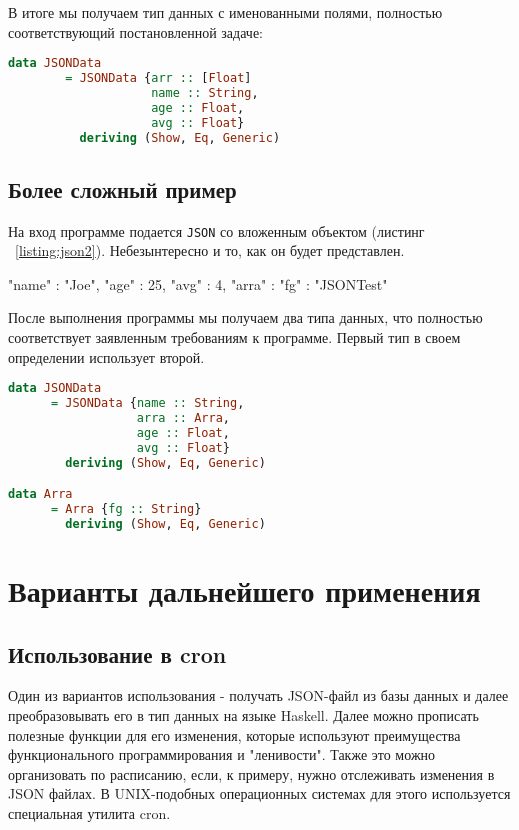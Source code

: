 В итоге мы получаем тип данных с именованными полями, полностью соответствующий постановленной задаче:

\begin{lstlisting}[language=Haskell]
data JSONData 
        = JSONData {arr :: [Float]
                    name :: String,
                    age :: Float,
                    avg :: Float}
          deriving (Show, Eq, Generic)
\end{lstlisting}

\section{Более сложный пример}

На вход программе подается \lstinline{JSON} со вложенным объектом (листинг ~\ref{listing:json2}).  Небезынтересно и то, как он будет представлен. 

\begin{ListingEnv}[H]
\begin{Verb}
{
    "name" : "Joe",
    "age" : 25,
    "avg" : 4,
    "arra" : 
             {
                 "fg" : "JSONTest"  
             }
}
\end{Verb}
\label{listing:json2}
\end{ListingEnv}

После выполнения программы мы получаем два типа данных, что полностью соответствует заявленным требованиям к программе. Первый тип в своем определении использует второй. 

\begin{lstlisting}[language=Haskell]
data JSONData
      = JSONData {name :: String,
                  arra :: Arra,
                  age :: Float,
                  avg :: Float}
        deriving (Show, Eq, Generic)

data Arra
      = Arra {fg :: String}
        deriving (Show, Eq, Generic)            
\end{lstlisting}

\chapter{Варианты дальнейшего применения}

\section{Использование в cron}

Один из вариантов использования - получать JSON-файл из базы данных и далее преобразовывать его в тип данных на языке Haskell. Далее можно прописать полезные функции для его изменения, которые используют преимущества функционального программирования и "ленивости". Также это можно организовать по расписанию, если, к примеру, нужно отслеживать изменения в JSON файлах. В UNIX-подобных операционных системах для этого используется специальная утилита cron.

